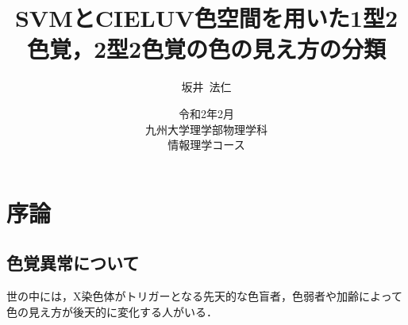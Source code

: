 \documentclass[uplatex,paper=a4,fontsize=4.0truemm,jafontsize=4.0truemm,head_space=30.0truemm,baselineskip=8.0truemm,gutter=25.0truemm,oneside,fleqn,hanging_panctuation,open_bracket_pos=nibu_tentsuki,dvipdfmx,jis2004,book,titlepage]{jlreq}
\title{\vspace{-25truemm}\Huge{SVMとCIELUV色空間を用いた1型2色覚，2型2色覚の色の見え方の分類}\vspace{55truemm}}
\author{\huge{坂井~法仁}}
\date{\LARGE{令和2年2月}\\ \vspace{30truemm}\LARGE{九州大学理学部物理学科\\ 情報理学コース}}
\theoremstyle{mystyle}
\begin{document}
	\maketitle
	\tableofcontents
	\clearpage
	\setcounter{page}{1}
	\chapter{序論}
		\section{色覚異常について}
			世の中には，X染色体がトリガーとなる先天的な色盲者\cite{Okabe2002a}，色弱者\cite{Sunaga2017}や加齢によって色の見え方が後天的に変化する人\cite{Kuriki2000}がいる．
\end{document}
